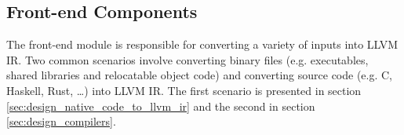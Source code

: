 
\subsection{Front-end Components}
\label{sec:design_front-end_components}

The front-end module is responsible for converting a variety of inputs into LLVM IR. Two common scenarios involve converting binary files (e.g. executables, shared libraries and relocatable object code) and converting source code (e.g. C, Haskell, Rust, …) into LLVM IR. The first scenario is presented in section \ref{sec:design_native_code_to_llvm_ir} and the second in section \ref{sec:design_compilers}.




